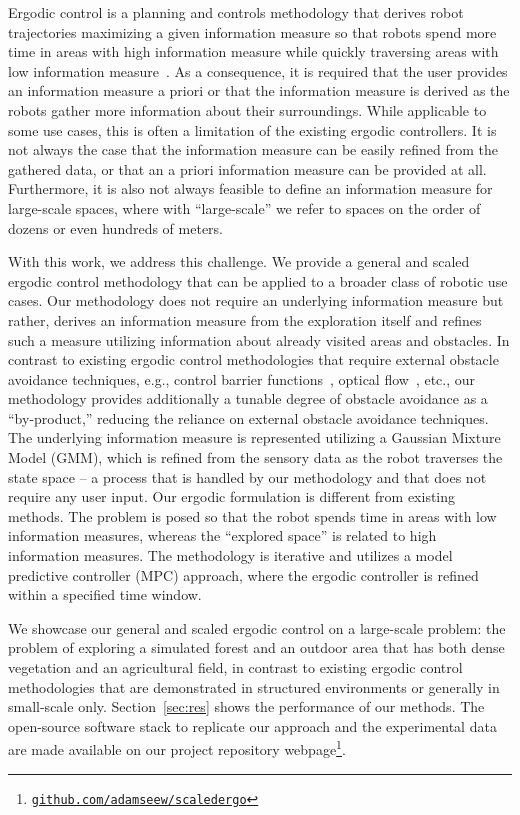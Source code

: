 \documentclass[letterpaper,10pt,conference,twoside]{IEEEtran}
\theoremstyle{definition}
\begin{document}
Ergodic control is a planning and controls methodology that derives robot trajectories maximizing a given information measure so that robots spend more time in areas with high information measure while quickly traversing areas with low information measure~\cite{mathew2011metrics,abraham2017ergodic,miller2013trajectory}. As a consequence, it is required that the user provides an information measure a priori or that the information measure is derived as the robots gather more information about their surroundings. While applicable to some use cases, this is often a limitation of the existing ergodic controllers. It is not always the case that the information measure can be easily refined from the gathered data, or that an a priori information measure can be provided at all. Furthermore, it is also not always feasible to define an information measure for large-scale spaces, %
where with ``large-scale'' we refer to spaces on the order of dozens or even hundreds of meters. 

With this work, we address this challenge. We provide a general and scaled ergodic control methodology that can be applied to a broader class of robotic use cases. Our methodology does not require an underlying information measure but rather, derives an information measure from the exploration itself and refines such a measure utilizing information about already visited areas and obstacles. %
In contrast to existing ergodic control methodologies that require external obstacle avoidance techniques, e.g., control barrier functions~\cite{lerch2023safety}, optical flow~\cite{prabhakar2020ergodic}, etc., our methodology provides additionally a tunable degree of obstacle avoidance as a ``by-product,'' reducing the reliance on external obstacle avoidance techniques.  
%
The underlying information measure is represented utilizing a Gaussian Mixture Model (GMM), which is refined from the sensory data as the robot traverses the state space -- a process that is handled by our methodology and that does not require any user input. Our ergodic formulation is different from existing methods. The problem is posed so that the robot spends time in areas with low information measures, whereas the ``explored space'' is related to high information measures. The methodology is iterative and utilizes a model predictive controller (MPC) approach, where the ergodic controller is refined within a specified time window.

\IEEEpubidadjcol
We showcase our general and scaled ergodic control on a large-scale problem: the problem of exploring a simulated forest and an outdoor area that has both dense vegetation and an agricultural field, in contrast to existing ergodic control methodologies that are demonstrated in structured environments or generally in small-scale only. Section~\ref{sec:res} shows the performance of our methods. The open-source software stack to replicate our approach and the experimental data are made available on our project repository webpage\footnote{\href{https://github.com/adamseew/scaledergo}{\tt github.com/adamseew/scaledergo}}.
\end{document}
